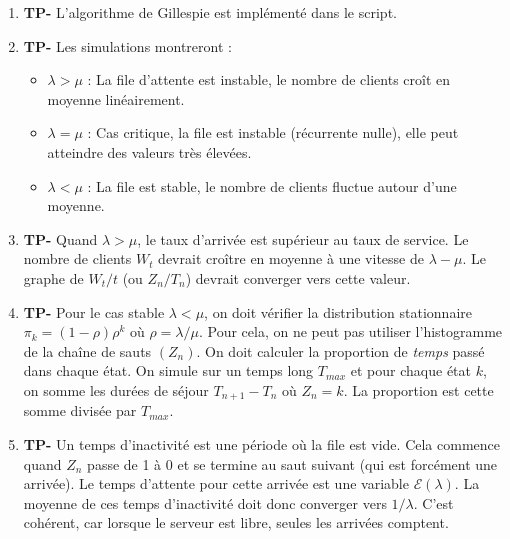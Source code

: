 \documentclass[solutions]{exercices}
\begin{document}
\begin{solution}
\begin{enumerate}
    \item \textbf{TP-} L'algorithme de Gillespie est implémenté dans le script.
    \item \textbf{TP-} Les simulations montreront :
    \begin{itemize}
        \item $\lambda > \mu$ : La file d'attente est instable, le nombre de clients croît en moyenne linéairement.
        \item $\lambda = \mu$ : Cas critique, la file est instable (récurrente nulle), elle peut atteindre des valeurs très élevées.
        \item $\lambda < \mu$ : La file est stable, le nombre de clients fluctue autour d'une moyenne.
    \end{itemize}
    \item \textbf{TP-} Quand $\lambda > \mu$, le taux d'arrivée est supérieur au taux de service. Le nombre de clients $W_t$ devrait croître en moyenne à une vitesse de $\lambda - \mu$. Le graphe de $W_t/t$ (ou $Z_n/T_n$) devrait converger vers cette valeur.
    \item \textbf{TP-} Pour le cas stable $\lambda < \mu$, on doit vérifier la distribution stationnaire $\pi_k = (1-\rho)\rho^k$ où $\rho=\lambda/\mu$. Pour cela, on ne peut pas utiliser l'histogramme de la chaîne de sauts $(Z_n)$. On doit calculer la proportion de \textit{temps} passé dans chaque état. On simule sur un temps long $T_{max}$ et pour chaque état $k$, on somme les durées de séjour $T_{n+1}-T_n$ où $Z_n=k$. La proportion est cette somme divisée par $T_{max}$.
    \item  \textbf{TP-} Un temps d'inactivité est une période où la file est vide. Cela commence quand $Z_n$ passe de 1 à 0 et se termine au saut suivant (qui est forcément une arrivée). Le temps d'attente pour cette arrivée est une variable $\mathcal{E}(\lambda)$. La moyenne de ces temps d'inactivité doit donc converger vers $1/\lambda$. C'est cohérent, car lorsque le serveur est libre, seules les arrivées comptent.
\end{enumerate}
\end{solution}
\end{document}
